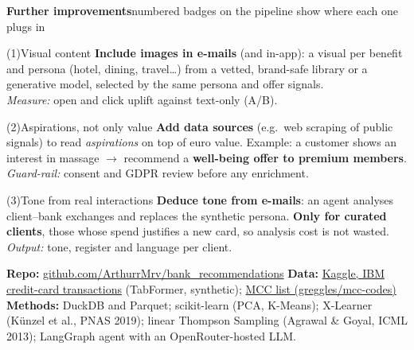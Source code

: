\documentclass[8pt,a4paper]{extarticle}
\begin{document}
\vspace{4pt}
{\color{navy}\bfseries\small Further improvements}\hfill{\tiny\color{cg}numbered badges on the pipeline show where each one plugs in}\par\vspace{-3pt}{\color{navy}\rule{\linewidth}{0.6pt}}\par\vspace{5pt}
\begin{minipage}[t]{0.325\textwidth}
\begin{imp}{(1)}{Visual content}
\textbf{Include images in e-mails} (and in-app): a visual per benefit and persona (hotel, dining, travel\dots) from a vetted, brand-safe library or a generative model, selected by the same persona and offer signals.\\[2pt]
\textit{Measure:} open and click uplift against text-only (A/B).
\end{imp}
\end{minipage}\hfill
\begin{minipage}[t]{0.325\textwidth}
\begin{imp}{(2)}{Aspirations, not only value}
\textbf{Add data sources} (e.g.\ web scraping of public signals) to read \emph{aspirations} on top of euro value. Example: a customer shows an interest in massage $\to$ recommend a \textbf{well-being offer to premium members}.\\[2pt]
\textit{Guard-rail:} consent and GDPR review before any enrichment.
\end{imp}
\end{minipage}\hfill
\begin{minipage}[t]{0.325\textwidth}
\begin{imp}{(3)}{Tone from real interactions}
\textbf{Deduce tone from e-mails}: an agent analyses client--bank exchanges and replaces the synthetic persona. \textbf{Only for curated clients}, those whose spend justifies a new card, so analysis cost is not wasted.\\[2pt]
\textit{Output:} tone, register and language per client.
\end{imp}
\end{minipage}

\vspace{5pt}
\begin{tcolorbox}[enhanced,colback=blue!4,colframe=cb!80!black,boxrule=0.5pt,arc=2pt,left=5pt,right=5pt,top=3pt,bottom=3pt]
\footnotesize
\textbf{\color{cb!80!black}Repo:} \href{https://github.com/ArthurrMrv/bank_recommendations}{github.com/ArthurrMrv/bank\_recommendations}\quad
\textbf{\color{cb!80!black}Data:} \href{https://www.kaggle.com/datasets/ealtman2019/credit-card-transactions}{Kaggle, IBM credit-card transactions} (TabFormer, synthetic); \href{https://github.com/greggles/mcc-codes}{MCC list (greggles/mcc-codes)}\\[1pt]
\textbf{\color{cb!80!black}Methods:} DuckDB and Parquet; scikit-learn (PCA, K-Means); X-Learner (K\"unzel et al., PNAS 2019); linear Thompson Sampling (Agrawal \& Goyal, ICML 2013); LangGraph agent with an OpenRouter-hosted LLM.
\end{tcolorbox}
\end{document}
